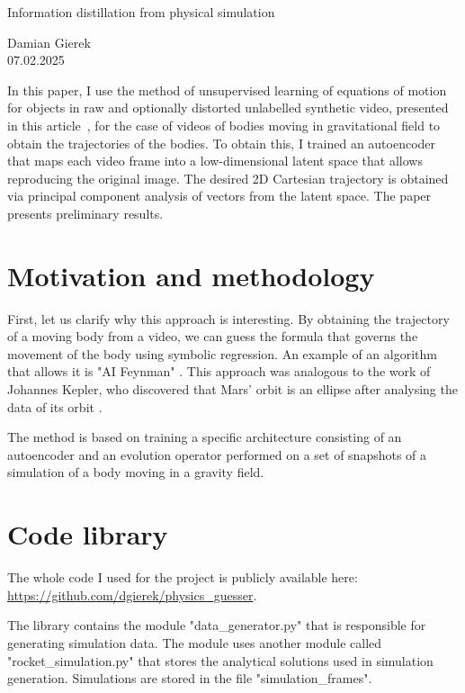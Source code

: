 \documentclass[12pt,letterpaper]{article}
\newcommand{\nid}{\noindent}
\begin{document}
\begin{center}
    \begin{huge}
     Information distillation from physical simulation\\[12pt]
    \end{huge}
    Damian Gierek\\
    \vspace{0.1em}
    07.02.2025
\end{center}

\hspace{0.3em}

\nid In this paper, I use the method of unsupervised learning of equations of motion for objects in raw and optionally distorted unlabelled synthetic video, presented in this article~\cite{Udrescu2021}, for the case of videos of bodies moving in gravitational field to obtain the trajectories of the bodies. To obtain this, I trained an autoencoder that maps each video frame into a low-dimensional latent space that allows reproducing the original image. The desired 2D Cartesian trajectory is obtained via principal component analysis of vectors from the latent space. The paper presents preliminary results.

\section{Motivation and methodology}

First, let us clarify why this approach is interesting. By obtaining the trajectory of a moving body from a video, we can guess the formula that governs the movement of the body using symbolic regression. An example of an algorithm that allows it is "AI Feynman" \cite{udrescu2020}. This approach was analogous to the work of Johannes Kepler, who discovered that Mars' orbit is an ellipse after analysing the data of its orbit \cite{koyre2013}. 

The method is based on training a specific architecture consisting of an autoencoder and an evolution operator performed on a set of snapshots of a simulation of a body moving in a gravity field.

\section{Code library}
The whole code I used for the project is publicly available here: \url{https://github.com/dgierek/physics_guesser}. 

The library contains the module "data\_generator.py" that is responsible for generating simulation data. The module uses another module called "rocket\_simulation.py" that stores the analytical solutions used in simulation generation. Simulations are stored in the file "simulation\_frames".
\end{document}
